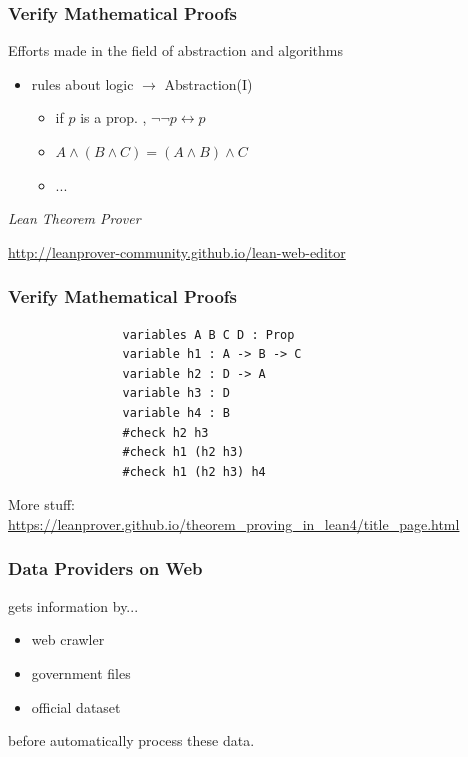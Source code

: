 \documentclass[11pt]{beamer}
\begin{document}
	\begin{frame}
		\frametitle{Verify Mathematical Proofs}
		
		Efforts made in the field of abstraction and algorithms
		\begin{itemize}
			\item rules about logic $\rightarrow$ Abstraction(I)
			\begin{itemize}
				\item if $p$ is a prop. , $\neg \neg p \leftrightarrow p$
				\item $A\wedge (B\wedge C) = (A\wedge B)\wedge C$
				\item ...
			\end{itemize}

		\end{itemize}

		\textit{Lean Theorem Prover}

		\url{http://leanprover-community.github.io/lean-web-editor}

		
	
	\end{frame}

	\begin{frame}[fragile=singleslide]
		\frametitle{Verify Mathematical Proofs}
		\begin{example}
			\begin{verbatim}
				variables A B C D : Prop
				variable h1 : A -> B -> C
				variable h2 : D -> A
				variable h3 : D
				variable h4 : B
				#check h2 h3
				#check h1 (h2 h3)
				#check h1 (h2 h3) h4
			\end{verbatim}
		\end{example}
	
	More stuff: \url{https://leanprover.github.io/theorem_proving_in_lean4/title_page.html}
	
	\end{frame}

	\begin{frame}
		\frametitle{Data Providers on Web}

		gets information by...
		\begin{itemize}
			\item web crawler
			\item government files
			\item official dataset
		\end{itemize}

		before automatically process these data.
	
		
	
	\end{frame}
\end{document}

